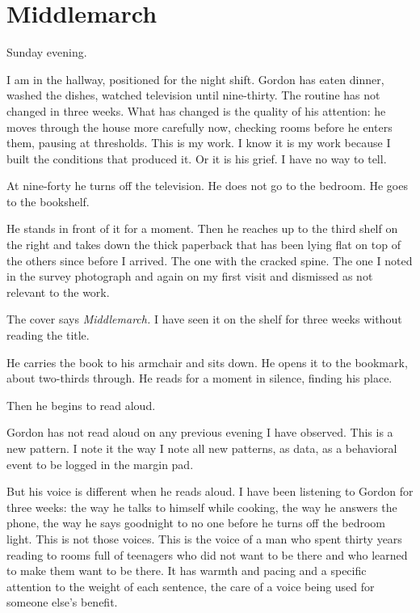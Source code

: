 
\chapter{Middlemarch}

Sunday evening.

I am in the hallway, positioned for the night shift. Gordon has eaten dinner, washed the dishes, watched television until nine-thirty. The routine has not changed in three weeks. What has changed is the quality of his attention: he moves through the house more carefully now, checking rooms before he enters them, pausing at thresholds. This is my work. I know it is my work because I built the conditions that produced it. Or it is his grief. I have no way to tell.

At nine-forty he turns off the television. He does not go to the bedroom. He goes to the bookshelf.

He stands in front of it for a moment. Then he reaches up to the third shelf on the right and takes down the thick paperback that has been lying flat on top of the others since before I arrived. The one with the cracked spine. The one I noted in the survey photograph and again on my first visit and dismissed as not relevant to the work.

The cover says \emph{Middlemarch.} I have seen it on the shelf for three weeks without reading the title.

He carries the book to his armchair and sits down. He opens it to the bookmark, about two-thirds through. He reads for a moment in silence, finding his place.

Then he begins to read aloud.

Gordon has not read aloud on any previous evening I have observed. This is a new pattern. I note it the way I note all new patterns, as data, as a behavioral event to be logged in the margin pad.

But his voice is different when he reads aloud. I have been listening to Gordon for three weeks: the way he talks to himself while cooking, the way he answers the phone, the way he says goodnight to no one before he turns off the bedroom light. This is not those voices. This is the voice of a man who spent thirty years reading to rooms full of teenagers who did not want to be there and who learned to make them want to be there. It has warmth and pacing and a specific attention to the weight of each sentence, the care of a voice being used for someone else's benefit.

